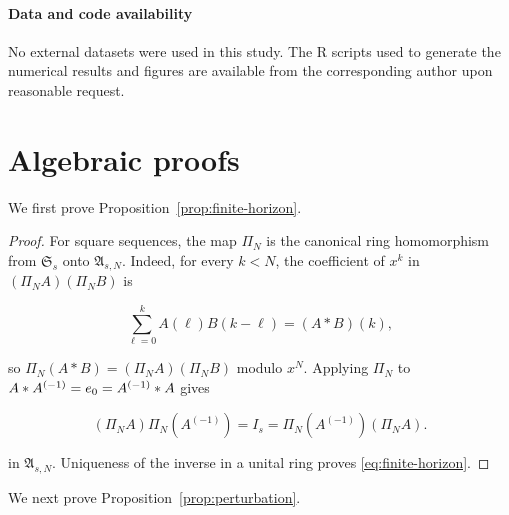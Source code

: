 \documentclass[3p,12pt,authoryear]{elsarticle}
\theoremstyle{definition}
\theoremstyle{remark}
\newcommand{\ez}{e_{\mathstrut 0}}
\begin{document}
\paragraph{Data and code availability}
No external datasets were used in this study. The R scripts used to generate the numerical results and figures are available from the corresponding author upon reasonable request.



\appendix

\section{Algebraic proofs}\label{app:algebra-proofs}

We first prove Proposition~\ref{prop:finite-horizon}.

\begin{proof}
For square sequences, the map $\Pi_N$ is the canonical ring homomorphism from $\mathfrak S_s$ onto $\mathfrak A_{s,N}$. Indeed, for every $k<N$, the coefficient of $x^k$ in $(\Pi_NA)(\Pi_NB)$ is

\begin{equation*}
\sum_{\ell=0}^{k}A(\ell)B(k-\ell)=(A*B)(k),
\end{equation*}

so $\Pi_N(A*B)=(\Pi_NA)(\Pi_NB)$ modulo $x^N$. Applying $\Pi_N$ to $A*A^{(-1)}=\ez=A^{(-1)}*A$ gives

\begin{equation*}
(\Pi_NA)\Pi_N(A^{(-1)})
=
I_s
=
\Pi_N(A^{(-1)})(\Pi_NA).
\end{equation*}

in $\mathfrak A_{s,N}$. Uniqueness of the inverse in a unital ring proves \eqref{eq:finite-horizon}.
\end{proof}

We next prove Proposition~\ref{prop:perturbation}.
\end{document}
